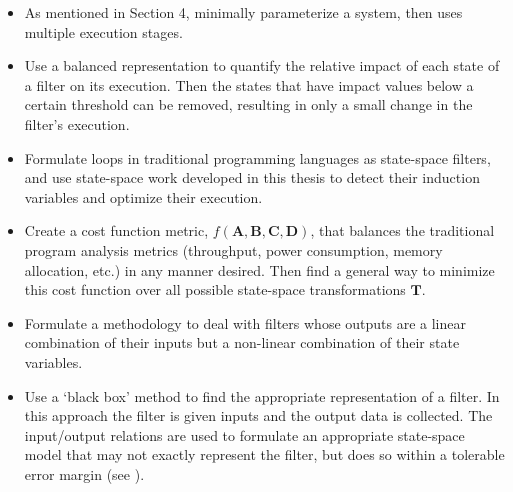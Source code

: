 \begin{itemize}

\item As mentioned in Section 4, minimally parameterize a system,
then uses multiple execution stages.

\item Use a balanced representation \cite{Moore} to quantify the
relative impact of each state of a filter on its execution. Then
the states that have impact values below a certain threshold can
be removed, resulting in only a small change in the filter's
execution.

\item Formulate loops in traditional programming languages as
state-space filters, and use state-space work developed in this
thesis to detect their induction variables and optimize their
execution.

\item Create a cost function metric,
$f(\mathbf{A},\mathbf{B},\mathbf{C},\mathbf{D})$, that balances
the traditional program analysis metrics (throughput, power
consumption, memory allocation, etc.) in any manner desired. Then
find a general way to minimize this cost function over all
possible state-space transformations $\mathbf{T}$.

\item Formulate a methodology to deal with filters whose outputs
are a linear combination of their inputs but a non-linear
combination of their state variables.

\item Use a `black box' method to find the appropriate
representation of a filter. In this approach the filter is given
inputs and the output data is collected. The input/output
relations are used to formulate an appropriate state-space model
that may not exactly represent the filter, but does so within a
tolerable error margin (see \cite{Schutter}).
\end{itemize}
